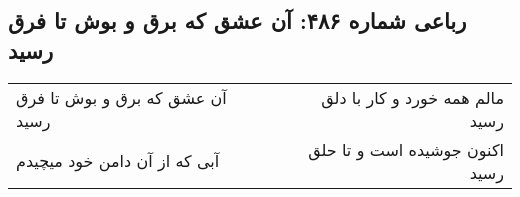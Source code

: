\begin{center}
\section*{رباعی شماره ۴۸۶: آن عشق که برق و بوش تا فرق رسید}
\label{sec:0486}
\begin{longtable}{l p{0.5cm} r}
آن عشق که برق و بوش تا فرق رسید
&&
مالم همه خورد و کار با دلق رسید
\\
آبی که از آن دامن خود میچیدم
&&
اکنون جوشیده است و تا حلق رسید
\\
\end{longtable}
\end{center}

